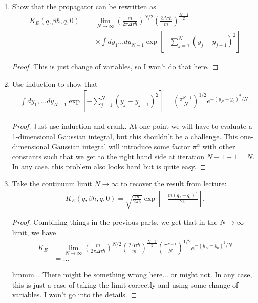 \documentclass{book}
\theoremstyle{definition}
\newcommand{\nn}{\nonumber}
\newcommand{\al}{\alpha}
\newcommand{\f}[2]{\frac{#1}{#2}}
\newcommand{\lp}{\left(}
\newcommand{\rp}{\right)}
\newcommand{\lb}{\left[}
\newcommand{\rb}{\right]}
\begin{document}
\begin{enumerate}
	\item Show that the propagator can be rewritten as
	\begin{align}
	K_E(q,\beta\hbar, q,0) = &\lim_{N\to \infty} \lp \f{m}{2\pi \Delta \tau \hbar} \rp^{N/2} \lp \f{2\Delta \tau \hbar}{m } \rp^{\f{N-1}{2}}\nn\\&\times  
	\int dy_1\dots dy_{N-1}\exp\lb -\sum^N_{j=1}(y_j - y_{j-1})^2 \rb
	\end{align}
	
	\begin{proof}
		This is just change of variables, so I won't do that here. 
	\end{proof}
	
	
	\item Use induction to show that 
	\begin{align}
	\int dy_1,\dots dy_{N-1}\exp\lb -\sum^N_{j=1}(y_j - y_{j-1})^2 \rb = \lp \f{\pi^{N-1}}{N} \rp^{1/2} e^{-(y_N - y_0)^2/N}.
	\end{align}
	
	\begin{proof}
		Just use induction and crank. At one point we will have to evaluate a 1-dimensional Gaussian integral, but this shouldn't be a challenge. This one-dimensional Gaussian integral will introduce some factor $\pi^\al$ with other constants such that we get to the right hand side at iteration $N-1+1 = N$. In any case, this problem also looks hard but is quite easy. 
	\end{proof}
	
	
	\item Take the continuum limit $N\to \infty$ to recover the result from lecture:
	\begin{align}
	K_E(q,\beta \hbar, q,0) = \sqrt{\f{m}{2\pi \beta }} \exp\lb -\f{m(q_f - q_i)^2}{2\beta} \rb.
	\end{align}
	\begin{proof}
		Combining things in the previous parts, we get that in the $N\to \infty$ limit, we have
		\begin{align}
		K_E &= \lim_{N\to \infty}  \lp \f{m}{2\pi \Delta \tau \hbar} \rp^{N/2} \lp \f{2\Delta \tau \hbar}{m } \rp^{\f{N-1}{2}}\lp \f{\pi^{N-1}}{N} \rp^{1/2} e^{-(y_N - y_0)^2/N}\nn\\
		&= \dots
		\end{align}
		
		
		hmmm... There might be something wrong here... or might not. In any case, this is just a case of taking the limit correctly and using some change of variables. I won't go into the details.
	\end{proof}
	
\end{enumerate}
\end{document}
